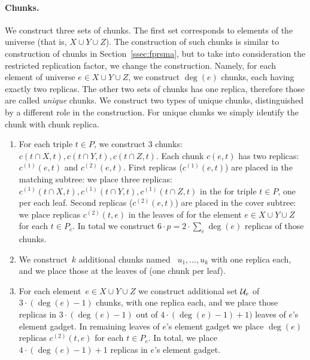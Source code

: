 \paragraph{Chunks.}
We construct three sets of chunks.
The first set corresponds to elements of the universe (that is, $X\cup Y\cup Z$).
The construction of such chunks is similar to construction of chunks in Section~\ref{ssec:fprsma}, but to take into consideration the restricted replication factor, we change the construction.
Namely, for each element of universe $e \in X \cup Y \cup Z$, we construct $\deg(e)$ chunks, each having exactly two replicas.
The other two sets of chunks has one replica, therefore those are called \emph{unique} chunks.
We construct two types of unique chunks, distinguished by a different role in the construction.
For unique chunks we simply identify the chunk with chunk replica.
\begin{enumerate}
  \item For each triple $t \in P$, we construct $3$ chunks:~$c(t \cap X, t), c(t \cap Y, t), c(t \cap Z, t)$.
  Each chunk $c(e, t)$ has two replicas: $c^{(1)}(e,t)$ and $c^{(2)}(e,t)$.
  First replicas ($c^{(1)}(e,t)$) are placed in the matching subtree:
  we place
  three replicas:
  ~$c^{(1)}(t \cap X, t), c^{(1)}(t \cap Y, t), c^{(1)}(t \cap Z, t)$ in the {\TripleGadget} for triple $t\in P$, one per each leaf.
  Second replicas ($c^{(2)}(e,t)$) are placed in the cover subtree:
  we place replicas $c^{(2)}(t, e)$ in the leaves of \ElGadget{} for the element $e \in X\cup Y\cup Z$ for each $t \in P_e$.
  In total we construct $6\cdot p = 2\cdot \sum_e\deg(e)$ replicas of those chunks.
  \item We construct~$k$ additional chunks named
  ~$u_1, \ldots, u_k$ with one replica each, and we place those at the leaves of \UnqGadgets (one chunk per leaf).
  \item For each element~$e\in X\cup Y\cup Z$
  we construct additional set ${\mathcal{U}_e}$ of $3\cdot(\deg(e) - 1)$ chunks, with one replica each, and we place those replicas in $3\cdot (\deg(e)-1)$ out of $4\cdot (\deg(e)-1)+1)$ leaves of $e$'s element gadget.
  In remaining leaves of $e$'s element gadget we place $\deg(e)$
 replicas $c^{(2)}(t, e)$ for each $t \in P_e$. In total, we place $4\cdot (\deg(e) - 1) + 1$ replicas in $e$'s element gadget.
\end{enumerate}

